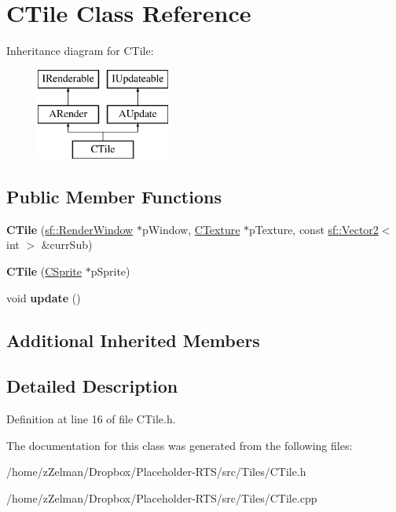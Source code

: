 \hypertarget{classCTile}{\section{C\-Tile Class Reference}
\label{classCTile}
}
Inheritance diagram for C\-Tile\-:\begin{figure}[H]
\begin{center}
\leavevmode
\includegraphics[height=3.000000cm]{classCTile}
\end{center}
\end{figure}
\subsection*{Public Member Functions}
\begin{DoxyCompactItemize}
\item 
\hypertarget{classCTile_a08b84ff46fbcc5c3d12215f031f509a5}{{\bfseries C\-Tile} (\hyperlink{classsf_1_1RenderWindow}{sf\-::\-Render\-Window} $\ast$p\-Window, \hyperlink{classCTexture}{C\-Texture} $\ast$p\-Texture, const \hyperlink{classsf_1_1Vector2}{sf\-::\-Vector2}$<$ int $>$ \&curr\-Sub)}\label{classCTile_a08b84ff46fbcc5c3d12215f031f509a5}

\item 
\hypertarget{classCTile_a07c38be9c331480eb7c8d526b084a287}{{\bfseries C\-Tile} (\hyperlink{classCSprite}{C\-Sprite} $\ast$p\-Sprite)}\label{classCTile_a07c38be9c331480eb7c8d526b084a287}

\item 
\hypertarget{classCTile_a818a17e48a7219eedac950b82c641ee0}{void {\bfseries update} ()}\label{classCTile_a818a17e48a7219eedac950b82c641ee0}

\end{DoxyCompactItemize}
\subsection*{Additional Inherited Members}


\subsection{Detailed Description}


Definition at line 16 of file C\-Tile.\-h.



The documentation for this class was generated from the following files\-:\begin{DoxyCompactItemize}
\item 
/home/z\-Zelman/\-Dropbox/\-Placeholder-\/\-R\-T\-S/src/\-Tiles/C\-Tile.\-h\item 
/home/z\-Zelman/\-Dropbox/\-Placeholder-\/\-R\-T\-S/src/\-Tiles/C\-Tile.\-cpp\end{DoxyCompactItemize}
